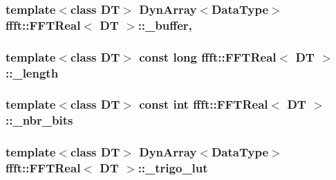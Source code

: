 \subsubsection[{\texorpdfstring{\+\_\+buffer}{_buffer}}]{\setlength{\rightskip}{0pt plus 5cm}template$<$class DT$>$ {\bf Dyn\+Array}$<${\bf Data\+Type}$>$ {\bf ffft\+::\+F\+F\+T\+Real}$<$ DT $>$\+::\+\_\+buffer\hspace{0.3cm}{\ttfamily [mutable]}, {\ttfamily [private]}}\hypertarget{classffft_1_1FFTReal_a9e29976841e3bf469336e3ea54e918f3}{}\label{classffft_1_1FFTReal_a9e29976841e3bf469336e3ea54e918f3}
\subsubsection[{\texorpdfstring{\+\_\+length}{_length}}]{\setlength{\rightskip}{0pt plus 5cm}template$<$class DT$>$ const long {\bf ffft\+::\+F\+F\+T\+Real}$<$ DT $>$\+::\+\_\+length\hspace{0.3cm}{\ttfamily [private]}}\hypertarget{classffft_1_1FFTReal_a04c882856db18a8be9c2c0b74fa4faf5}{}\label{classffft_1_1FFTReal_a04c882856db18a8be9c2c0b74fa4faf5}
\subsubsection[{\texorpdfstring{\+\_\+nbr\+\_\+bits}{_nbr_bits}}]{\setlength{\rightskip}{0pt plus 5cm}template$<$class DT$>$ const int {\bf ffft\+::\+F\+F\+T\+Real}$<$ DT $>$\+::\+\_\+nbr\+\_\+bits\hspace{0.3cm}{\ttfamily [private]}}\hypertarget{classffft_1_1FFTReal_a009acfbabe3450f2d9cb0bcb7eb7a366}{}\label{classffft_1_1FFTReal_a009acfbabe3450f2d9cb0bcb7eb7a366}
\subsubsection[{\texorpdfstring{\+\_\+trigo\+\_\+lut}{_trigo_lut}}]{\setlength{\rightskip}{0pt plus 5cm}template$<$class DT$>$ {\bf Dyn\+Array}$<${\bf Data\+Type}$>$ {\bf ffft\+::\+F\+F\+T\+Real}$<$ DT $>$\+::\+\_\+trigo\+\_\+lut\hspace{0.3cm}{\ttfamily [private]}}\hypertarget{classffft_1_1FFTReal_a5c28c732a8f3a262bc6e0527c3903970}{}\label{classffft_1_1FFTReal_a5c28c732a8f3a262bc6e0527c3903970}
